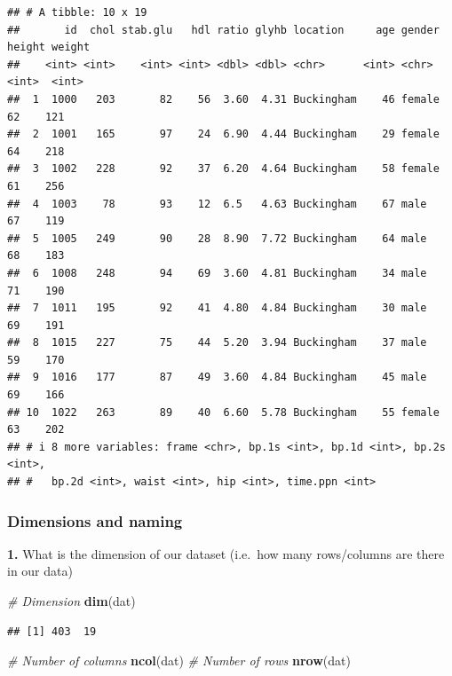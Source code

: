 \documentclass[
]{book}
\newenvironment{Shaded}{\begin{snugshade}}{\end{snugshade}}
\newcommand{\CommentTok}[1]{\textcolor[rgb]{0.56,0.35,0.01}{\textit{#1}}}
\newcommand{\FunctionTok}[1]{\textcolor[rgb]{0.13,0.29,0.53}{\textbf{#1}}}
\newcommand{\NormalTok}[1]{#1}
\begin{document}
\begin{verbatim}
## # A tibble: 10 x 19
##       id  chol stab.glu   hdl ratio glyhb location     age gender height weight
##    <int> <int>    <int> <int> <dbl> <dbl> <chr>      <int> <chr>   <int>  <int>
##  1  1000   203       82    56  3.60  4.31 Buckingham    46 female     62    121
##  2  1001   165       97    24  6.90  4.44 Buckingham    29 female     64    218
##  3  1002   228       92    37  6.20  4.64 Buckingham    58 female     61    256
##  4  1003    78       93    12  6.5   4.63 Buckingham    67 male       67    119
##  5  1005   249       90    28  8.90  7.72 Buckingham    64 male       68    183
##  6  1008   248       94    69  3.60  4.81 Buckingham    34 male       71    190
##  7  1011   195       92    41  4.80  4.84 Buckingham    30 male       69    191
##  8  1015   227       75    44  5.20  3.94 Buckingham    37 male       59    170
##  9  1016   177       87    49  3.60  4.84 Buckingham    45 male       69    166
## 10  1022   263       89    40  6.60  5.78 Buckingham    55 female     63    202
## # i 8 more variables: frame <chr>, bp.1s <int>, bp.1d <int>, bp.2s <int>,
## #   bp.2d <int>, waist <int>, hip <int>, time.ppn <int>
\end{verbatim}

\hypertarget{dimensions-and-naming}{%
\subsubsection{Dimensions and naming}\label{dimensions-and-naming}}

\textbf{1.} What is the dimension of our dataset (i.e.~how many rows/columns are there in our data)

\begin{Shaded}
\begin{Highlighting}[]
\CommentTok{\# Dimension}
\FunctionTok{dim}\NormalTok{(dat)}
\end{Highlighting}
\end{Shaded}

\begin{verbatim}
## [1] 403  19
\end{verbatim}

\begin{Shaded}
\begin{Highlighting}[]
\CommentTok{\# Number of columns}
\FunctionTok{ncol}\NormalTok{(dat)}
\CommentTok{\# Number of rows}
\FunctionTok{nrow}\NormalTok{(dat)}
\end{Highlighting}
\end{Shaded}
\end{document}
